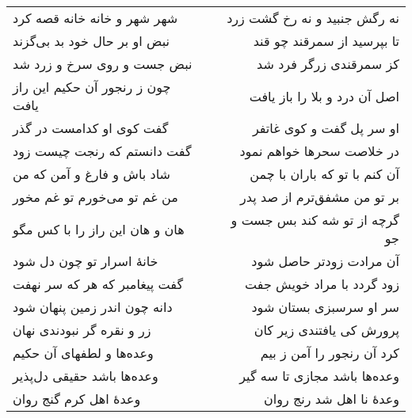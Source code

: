 \begin{center}
\begin{longtable}{l p{0.5cm} r}
شهر شهر و خانه خانه قصه کرد
&&
نه رگش جنبید و نه رخ گشت زرد
\\
نبض او بر حال خود بد بی‌گزند
&&
تا بپرسید از سمرقند چو قند
\\
نبض جست و روی سرخ و زرد شد
&&
کز سمرقندی زرگر فرد شد
\\
چون ز رنجور آن حکیم این راز یافت
&&
اصل آن درد و بلا را باز یافت
\\
گفت کوی او کدامست در گذر
&&
او سر پل گفت و کوی غاتفر
\\
گفت دانستم که رنجت چیست زود
&&
در خلاصت سحرها خواهم نمود
\\
شاد باش و فارغ و آمن که من
&&
آن کنم با تو که باران با چمن
\\
من غم تو می‌خورم تو غم مخور
&&
بر تو من مشفق‌ترم از صد پدر
\\
هان و هان این راز را با کس مگو
&&
گرچه از تو شه کند بس جست و جو
\\
خانهٔ اسرار تو چون دل شود
&&
آن مرادت زودتر حاصل شود
\\
گفت پیغامبر که هر که سر نهفت
&&
زود گردد با مراد خویش جفت
\\
دانه چون اندر زمین پنهان شود
&&
سر او سرسبزی بستان شود
\\
زر و نقره گر نبودندی نهان
&&
پرورش کی یافتندی زیر کان
\\
وعده‌ها و لطفهای آن حکیم
&&
کرد آن رنجور را آمن ز بیم
\\
وعده‌ها باشد حقیقی دل‌پذیر
&&
وعده‌ها باشد مجازی تا سه گیر
\\
وعدهٔ اهل کرم گنج روان
&&
وعدهٔ نا اهل شد رنج روان
\\
\end{longtable}
\end{center}
